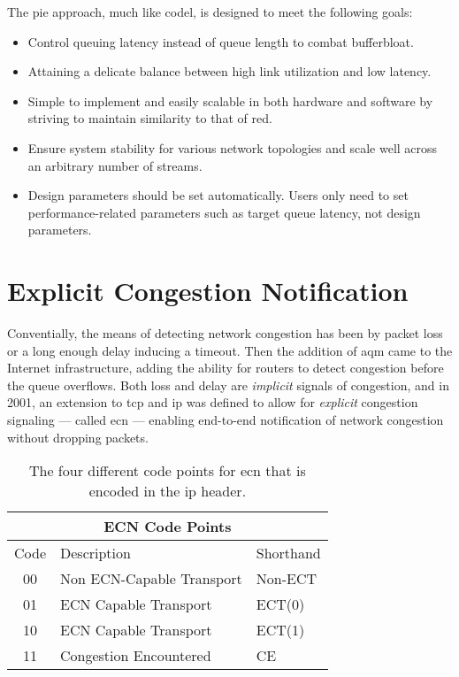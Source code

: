 The \gls{pie} approach, much like \gls{codel}, is designed to meet the following goals: \cite{rfc8033}

\begin{itemize}
    \item Control queuing latency instead of queue length to combat bufferbloat.
    \item Attaining a delicate balance between high link utilization and low latency.
    \item Simple to implement and easily scalable in both hardware and software by striving to maintain similarity to that of \gls{red}.
    \item Ensure system stability for various network topologies and scale well across an arbitrary number of streams.
    \item Design parameters should be set automatically. Users only need to set performance-related parameters such as target queue latency, not design parameters.
\end{itemize}







\section{Explicit Congestion Notification}

Conventially, the means of detecting network congestion has been by packet loss or a long enough delay inducing a timeout. Then the addition of \gls{aqm} came to the Internet infrastructure, adding the ability for routers to detect congestion before the queue overflows. Both loss and delay are \textit{implicit} signals of congestion, and in 2001, an extension to \gls{tcp} and \gls{ip} was defined \cite{rfc3168} to allow for \textit{explicit} congestion signaling --- called \gls{ecn} --- enabling end-to-end notification of network congestion without dropping packets.

\begin{wraptable}{r}{9cm}
    \begin{tabular}{|c|l|l|}
        \multicolumn{3}{c}{ECN Code Points} \\
        \hline
        Code & Description & Shorthand \\
        \hline
        00 & Non ECN-Capable Transport & Non-ECT \\
        \hline
        01 & ECN Capable Transport & ECT(0) \\
        \hline
        10 & ECN Capable Transport & ECT(1) \\
        \hline
        11 & Congestion Encountered & CE \\
        \hline
    \end{tabular}
    \caption{The four different code points for \gls{ecn} that is encoded in the \gls{ip} header.}
    \label{table:ecn}
\end{wraptable}

